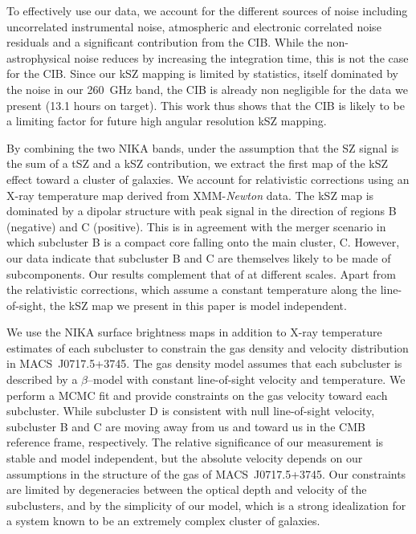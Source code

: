 \documentclass[twocolumn,traditabstract]{aa}
\begin{document}
To effectively use our data, we account for the different sources of noise including uncorrelated instrumental noise, atmospheric and electronic correlated noise residuals and a significant contribution from the CIB. While the non-astrophysical noise reduces by increasing the integration time, this is not the case for the CIB. Since our kSZ mapping is limited by statistics, itself dominated by the noise in our 260~GHz band, the CIB is already non negligible for the data we present (13.1 hours on target). This work thus shows that the CIB is likely to be a limiting factor for future high angular resolution kSZ mapping.

By combining the two NIKA bands, under the assumption that the SZ signal is the sum of a tSZ and a kSZ contribution, we extract the first map of the kSZ effect toward a cluster of galaxies. We account for relativistic corrections using an X-ray temperature map derived from XMM-{\it Newton} data. The kSZ map is dominated by a dipolar structure with peak signal in the direction of regions B (negative) and C (positive). This is in agreement with the merger scenario in which subcluster B is a compact core falling onto the main cluster, C. However, our data indicate that subcluster B and C are themselves likely to be made of subcomponents. Our results complement that of \cite{Sayers2013} at different scales. Apart from the relativistic corrections, which assume a constant temperature along the line-of-sight, the kSZ map we present in this paper is model independent.

We use the NIKA surface brightness maps in addition to X-ray temperature estimates of each subcluster to constrain the gas density and velocity distribution in \mbox{MACS~J0717.5+3745}. The gas density model assumes that each subcluster is described by a $\beta$--model with constant line-of-sight velocity and temperature. We perform a MCMC fit and provide constraints on the gas velocity toward each subcluster. While subcluster D is consistent with null line-of-sight velocity, subcluster B and C are moving away from us and toward us in the CMB reference frame, respectively. The relative significance of our measurement is stable and model independent, but the absolute velocity depends on our assumptions in the structure of the gas of \mbox{MACS~J0717.5+3745}. Our constraints are limited by degeneracies between the optical depth and velocity of the subclusters, and by the simplicity of our model, which is a strong idealization for a system known to be an extremely complex cluster of galaxies.
\end{document}

